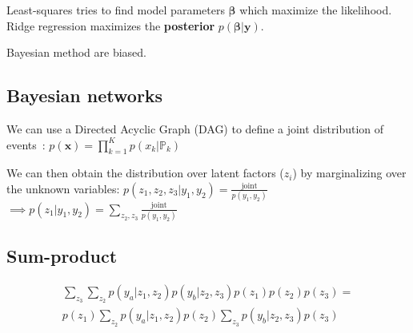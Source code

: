 \documentclass[10pt,a4paper,landscape]{article}
\renewcommand{\bf}[1]{\ensuremath{\mathbf{#1}}}
\newcommand{\bbeta}{\boldsymbol\beta}
\begin{document}
\begin{multicols*}{4}

Least-squares tries to find model parameters $\bbeta$ which maximize the likelihood. Ridge regression maximizes the \textbf{posterior} $p(\bbeta|\bf{y})$.

Bayesian method are biased.

\subsection{Bayesian networks}
We can use a Directed Acyclic Graph (DAG) to define a joint distribution of events~: %
$p(\bf{x}) = \prod_{k=1}^K p(x_k|\mathbb{P}_k)$


We can then obtain the distribution over latent factors ($z_i$) by marginalizing over the unknown variables:
$p(z_1, z_2, z_3 | y_1, y_2) = \frac{\text{joint}}{p(y_1, y_2)}$\\
$\implies p(z_1 | y_1, y_2) = \sum_{z_2, z_3} \frac{\text{joint}}{p(y_1, y_2)}$

\subsection{Sum-product}
\begin{multline*}
\sum_{z_3} \sum_{z_2} p(y_a|z_1,z_2) p(y_b|z_2,z_3) p(z_1) p(z_2) p(z_3) = \\ p(z_1) \sum_{z_2} p(y_a|z_1,z_2) p(z_2) \sum_{z_3} p(y_b|z_2,z_3) p(z_3)
\end{multline*}


\end{multicols*}
\end{document}
